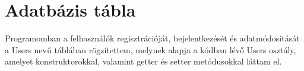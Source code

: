 \documentclass{thesis-ekf}
\begin{document}
	\section{Adatbázis tábla}
	Programomban a felhasználók regisztrációját, bejelentkezését és adatmódosítását a Users nevű táblában rögzítettem, melynek alapja a kódban lévő Users osztály, amelyet konstruktorokkal, valamint getter és setter metódusokkal láttam el.
	
	\begin{figure}[htb]
		\begin{floatrow}
		\end{floatrow}
	\end{figure}
	
\end{document}

